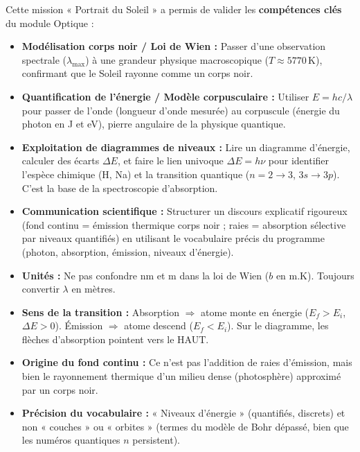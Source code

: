\documentclass[11pt]{article}
\newcommand{\cle}[1]{{\popxbold\color{popdark}#1}}
\newcounter{popsec}
\newcounter{popsub}
\newcommand{\courssub}[1]{%
  \stepcounter{popsub}%
  \par\vspace{9pt}\noindent{\popxbold\fontsize{11.5}{13}\selectfont\color{popink}{\color{poporange}\thepopsec.\thepopsub}\hspace{6pt}#1}\par\nopagebreak\vspace{4pt}
}
\begin{document}
\courssub{Bilan de l'activité}
Cette mission « Portrait du Soleil » a permis de valider les \textbf{compétences clés} du module Optique :
\begin{itemize}
    \item \textbf{Modélisation corps noir / Loi de Wien :} Passer d'une observation spectrale ($\lambda_{\text{max}}$) à une grandeur physique macroscopique ($T \approx 5770\,\text{K}$), confirmant que le Soleil rayonne comme un corps noir.
    \item \textbf{Quantification de l'énergie / Modèle corpusculaire :} Utiliser $E = hc/\lambda$ pour passer de l'onde (longueur d'onde mesurée) au corpuscule (énergie du photon en J et eV), pierre angulaire de la physique quantique.
    \item \textbf{Exploitation de diagrammes de niveaux :} Lire un diagramme d'énergie, calculer des écarts $\Delta E$, et faire le lien univoque $\Delta E = h\nu$ pour identifier l'espèce chimique (H, Na) et la transition quantique ($n=2\to3$, $3s\to3p$). C'est la base de la \cle{spectroscopie d'absorption}.
    \item \textbf{Communication scientifique :} Structurer un discours explicatif rigoureux (fond continu = émission thermique corps noir ; raies = absorption sélective par niveaux quantifiés) en utilisant le vocabulaire précis du programme (\cle{photon}, \cle{absorption}, \cle{émission}, \cle{niveaux d'énergie}).
\end{itemize}
\medskip
\begin{attention}
\begin{itemize}
    \item \textbf{Unités :} Ne pas confondre nm et m dans la loi de Wien ($b$ en m.K). Toujours convertir $\lambda$ en mètres.
    \item \textbf{Sens de la transition :} Absorption $\Rightarrow$ atome monte en énergie ($E_f > E_i$, $\Delta E > 0$). Émission $\Rightarrow$ atome descend ($E_f < E_i$). Sur le diagramme, les flèches d'absorption pointent vers le HAUT.
    \item \textbf{Origine du fond continu :} Ce n'est pas l'addition de raies d'émission, mais bien le rayonnement thermique d'un milieu dense (photosphère) approximé par un corps noir.
    \item \textbf{Précision du vocabulaire :} « Niveaux d'énergie » (quantifiés, discrets) et non « couches » ou « orbites » (termes du modèle de Bohr dépassé, bien que les numéros quantiques $n$ persistent).
\end{itemize}
\end{attention}
\end{document}
